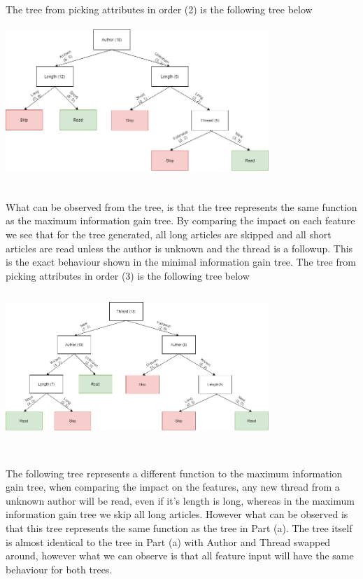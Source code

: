 \documentclass{article}
\begin{document}
\begin{enumerate}[(a)]
\newpage
The tree from picking attributes in order (2) is the following tree below
\begin{center}
\hspace*{-1cm}
\includegraphics[width=376px,height=210px]{tree4.png}
\end{center}\\
What can be observed from the tree, is that the tree represents the same function as the maximum information gain tree. By comparing the impact on each feature we see that for the  tree generated, all long articles are skipped and all short articles are read unless the author is unknown and the thread is a followup. This is the exact behaviour shown in the minimal information gain tree.\newpage
The tree from picking attributes in order (3) is the following tree below
\begin{center}
\hspace*{-1cm}
\includegraphics[width=376px,height=210px]{tree5.png}
\end{center}\\
The following tree represents a different function to the  maximum information gain tree, when comparing the impact on the features, any new thread from a unknown author will be read, even if it's length is long, whereas in the maximum information gain tree we skip all long articles. However what can be observed is that this tree represents the same function as the tree in Part (a). The tree itself is almost identical to the tree in Part (a) with Author and Thread swapped around, however what we can observe is that all feature input will have the same behaviour for both trees.


\end{enumerate}
\end{document}

